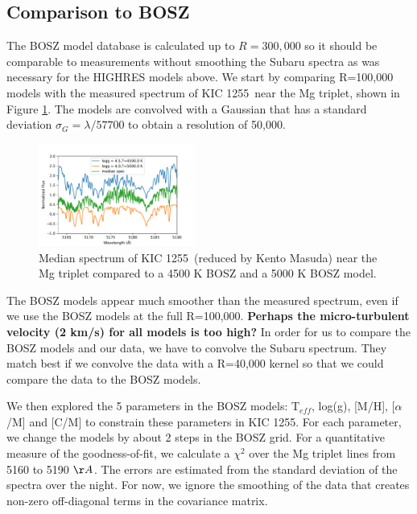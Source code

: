 \documentclass[twocolumn]{aastex61}
\newcommand{\shStar}{KIC 1255}
\begin{document}
\subsection{Comparison to BOSZ}
The BOSZ  \citep{bohlin2017bosz} model database is calculated up to $R = 300,000$ so it should be comparable to measurements without smoothing the Subaru spectra as was necessary for the HIGHRES models above.
We start by comparing R=100,000 models with the measured spectrum of \shStar\ near the Mg triplet, shown in Figure \ref{fig:mgTripletBOSZMedianW5000}.
The models are convolved with a Gaussian that has a standard deviation $\sigma_G = \lambda/57700$  to obtain a resolution of 50,000.

\begin{figure}[!hbtp]
\begin{centering}
\includegraphics[width=0.45\textwidth]{images/subaru/bosz_mg_triplet_median_spec_w_5000.pdf}
\caption{Median spectrum of \shStar\ (reduced by Kento Masuda) near the Mg triplet compared to a 4500 K BOSZ and a 5000 K BOSZ model.}\label{fig:mgTripletBOSZMedianW5000}
\end{centering}
\end{figure}

The BOSZ models appear much smoother than the measured spectrum, even if we use the BOSZ models at the full R=100,000.
\textbf{Perhaps the micro-turbulent velocity (2 km/s) for all models is too high?}
In order for us to compare the BOSZ models and our data, we have to convolve the Subaru spectrum.
They match best if we convolve the data with a R=40,000 kernel so that we could compare the data to the BOSZ models.

We then explored the 5 parameters in the BOSZ models: T$_{eff}$, log(g), [M/H], [$\alpha$/M] and [C/M] to constrain these parameters in \shStar.
For each parameter, we change the models by about 2 steps in the BOSZ grid.
For a quantitative measure of the goodness-of-fit, we calculate a $\chi^2$ over the Mg triplet lines from 5160 to 5190 $\AA$.
The errors are estimated from the standard deviation of the spectra over the night.
For now, we ignore the smoothing of the data that creates non-zero off-diagonal terms in the covariance matrix.
\end{document}

